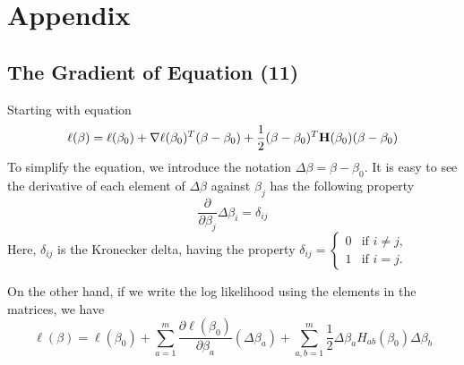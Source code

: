 \documentclass[12pt, oneside]{article}
\begin{document}
\section{Appendix}
\subsection{The Gradient of Equation (11)}
Starting with equation 
\begin{equation}
\ell({\beta})=\ell( {\beta_0} )+\nabla\ell(\beta_0)^T({\beta}-{\beta_0})+\frac{1}{2}(\beta-\beta_0)^T\mathbf{H}(\beta_0)(\beta-\beta_0)\\
\end{equation}
To simplify the equation, we introduce the notation $\Delta\beta=\beta-\beta_0$. It is easy to see the derivative of each element of 
$\Delta\beta$ against $\beta_j$ has the following property 
\begin{equation}
\frac{\partial}{\partial\beta_j}\Delta\beta_i=\delta_{ij}
\end{equation}
Here, $\delta_{ij}$ is the Kronecker delta, having the property $\delta _{{ij}}={\begin{cases}0&{\text{if }}i\neq j,\\1&{\text{if }}i=j.\end{cases}}$

On the other hand, if we write the log likelihood using the elements in the matrices, we have 
\begin{equation}
\ell({\beta})=\ell({\beta_0})+\sum\limits_{a=1}^m\frac{\partial{\ell(\beta_0)}}{\partial\beta_a}(\Delta\beta_a)+\sum\limits_{a,b=1}^m\frac{1}{2}\Delta\beta_a{H_{ab}}(\beta_0)\Delta\beta_b
\end{equation}
\end{document}
